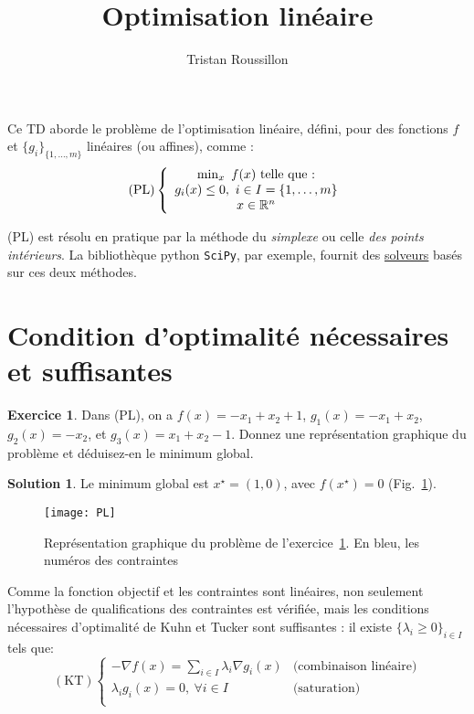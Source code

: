 \documentclass[a4paper,francais]{article}
\title{Optimisation linéaire}
\author{Tristan Roussillon}
\newcommand{\R}{{\ensuremath\mathbb{R}}}
\theoremstyle{definition}
\newtheorem{exercice}{Exercice}[section]
\newtheorem*{solution}{Solution}
\begin{document}
\maketitle

Ce TD aborde le problème de l'optimisation linéaire, défini,
pour des fonctions $f$ et $\{g_i\}_{\{1, \dots, m\}}$ linéaires (ou affines),
comme :
\[
\text{(PL)} \left\{
\begin{array}{c}
  \min_x \ f(x) \ \text{telle que :} \\
  g_i(x) \leq 0, \ i \in I = \{1, \dots, m\} \\
  x \in \R^n \\
\end{array}
\right.
\]

(PL) est résolu en pratique par la méthode du \emph{simplexe}
ou celle \emph{des points intérieurs}. La bibliothèque python
\texttt{SciPy}, par exemple, fournit des
\href{https://docs.scipy.org/doc/scipy/reference/generated/scipy.optimize.linprog.html}{solveurs}
basés sur ces deux méthodes.

\section{Condition d'optimalité nécessaires et suffisantes}


\begin{exercice}
  \label{ex:ex}
  Dans (PL), on a $f(x) = -x_1 + x_2 + 1$, $g_1(x) = -x_1 + x_2$, $g_2(x) = -x_2$, 
  et $g_3(x) = x_1 + x_2 - 1$. Donnez une représentation graphique du problème
  et déduisez-en le minimum global.
\end{exercice}

\begin{solution}
Le minimum global est $x^\star = (1,0)$, avec $f(x^\star) = 0$ (Fig.~\ref{fig:exPL}).  
\begin{figure}
  \texttt{[image: PL]}
  \caption{Représentation graphique du problème de l'exercice~\ref{ex:ex}.
    En bleu, les numéros des contraintes}
  \label{fig:exPL}
\end{figure}
\end{solution}

Comme la fonction objectif et les contraintes sont linéaires, non seulement
l'hypothèse de qualifications des contraintes est vérifiée, mais les conditions
nécessaires d'optimalité de Kuhn et Tucker sont suffisantes : 
il existe $\{\lambda_i \geq 0\}_{i \in I}$ tels que:
\[
(\text{KT})
\left\{
\begin{array}{ll}
  -{\nabla f}(x) = \sum_{i \in I} \lambda_i {\nabla g_i}(x) & \text{(combinaison linéaire)}\\
  \lambda_i g_i(x) = 0, \ \forall i \in I  & \text{(saturation)}\\
\end{array}
\right.
\]
\end{document}
